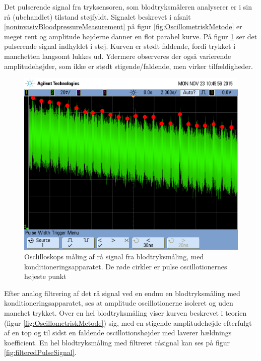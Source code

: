 Det pulserende signal fra tryksensoren, som blodtryksmåleren analyserer er i sin rå (ubehandlet) tilstand støjfyldt. Signalet beskrevet i afsnit \ref{noninvasivBloodpressureMeasurement} på figur \ref{fig:OscillometriskMetode} er meget rent og amplitude højderne danner en flot parabel kurve. På figur \ref{fig:rawPulseSignal} ser det pulserende signal indhyldet i støj. Kurven er stødt faldende, fordi trykket i manchetten langsomt lukkes ud. Ydermere observeres der også varierende amplitudehøjder, som ikke er stødt stigende/faldende, men virker  tilfældigheder.  

\begin{figure}[H]
	\centering
	\includegraphics[trim={0 7cm 0 1.5cm},clip, width=1\textwidth]{billeder/rawPulseSignalPeaks.png}
	\caption{Osclilloskops måling af rå signal fra blodtryksmåling, med konditioneringsapparatet. De røde cirkler er pulse oscillotionernes højeste punkt}\label{fig:rawPulseSignal}
\end{figure}

Efter analog filtrering af det rå signal ved en endnu en blodtryksmåling med konditioneringsapparatet, ses at amplitude oscillotionerne isoleret og uden manchet trykket. Over en hel blodtryksmåling viser kurven beskrevet i teorien (figur \ref{fig:OscillometriskMetode}) sig, med en stigende amplitudehøjde efterfulgt af en top og til sidst en faldende oscillotionshøjder med laverer hældnings koefficient. En hel blodtryksmåling med filtreret råsignal kan ses på figur \ref{fig:filteredPulseSignal}.

